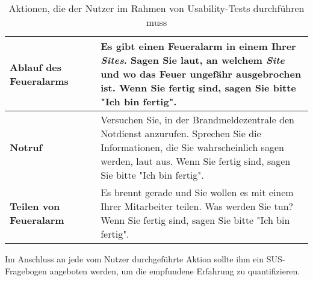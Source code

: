\begin{table}[H]
\begin{tabular}{p{0.3\linewidth} |p{0.7\linewidth}}
    \textbf{Ablauf des Feueralarms}                   & Es gibt einen Feueralarm in einem Ihrer \textit{Sites}. Sagen Sie laut, an welchem \textit{Site} und wo das Feuer ungefähr ausgebrochen ist. Wenn Sie fertig sind, sagen Sie bitte "Ich bin fertig".                                                                                                              \\\hline
    \textbf{Notruf}                                   & Versuchen Sie, in der Brandmeldezentrale den Notdienst anzurufen. Sprechen Sie die Informationen, die Sie wahrscheinlich sagen werden, laut aus. Wenn Sie fertig sind, sagen Sie bitte "Ich bin fertig".                                                                                                          \\\hline
    \textbf{Teilen von Feueralarm}                    & Es brennt gerade und Sie wollen es mit einem Ihrer Mitarbeiter teilen. Was werden Sie tun? Wenn Sie fertig sind, sagen Sie bitte "Ich bin fertig".
  \end{tabular}
  \caption{Aktionen, die der Nutzer im Rahmen von Usability-Tests durchführen muss}
\end{table}

Im Anschluss an jede vom Nutzer durchgeführte Aktion sollte ihm ein \ac{SUS}-Fragebogen angeboten werden, um die empfundene Erfahrung zu quantifizieren.
